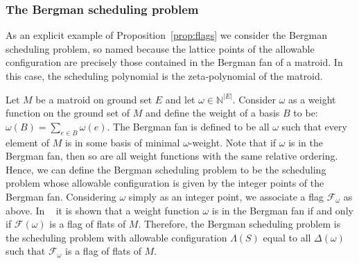 \documentclass[12pt,reqno]{amsart}
\numberwithin{definition}{section}
\theoremstyle{definition}
\newcommand{\om}{\omega}
\newcommand{\allow}{\Lambda} %
\begin{document}
\subsubsection{The Bergman scheduling problem} As an explicit example of Proposition~\ref{prop:flags} we consider the Bergman
scheduling problem, so named because the lattice points of the
allowable configuration are precisely those contained in the Bergman
fan of a matroid. In this case, the scheduling polynomial is the
zeta-polynomial of the matroid.

Let $M$ be a matroid on ground set $E$ and let $\omega \in
\mathbb{N}^{|E|}$.  Consider $\omega$ as a weight function on the ground
set of $M$ and define the weight of a basis $B$ to be: $\omega(B) =
\sum_{e\in B} \omega(e)$.  The Bergman fan is defined to be  all
$\omega$ such that every element of $M$ is in some basis of minimal $\omega$-weight.  Note that if $\omega$ is in the Bergman fan, then so are all
weight functions with the same relative ordering.  Hence, we can
define the Bergman scheduling problem to be the scheduling problem
whose allowable configuration is given by the integer points of the
Bergman fan.
  Considering $\omega$ simply as an integer
  point, we associate a flag $\mathscr{F}_{\omega}$ as above.
In ~\cite{AK} it is shown that a weight function $\omega$ is  in the Bergman fan
if and only if $\mathscr{F}(\om)$ is a flag of flats of $M$.
Therefore, the Bergman scheduling problem is the scheduling problem with allowable configuration $\allow(S)$ equal to all $\Delta(\om)$ such that $\mathcal{F}_{\omega}$ is a flag of flats of $M$. 

\end{document}
